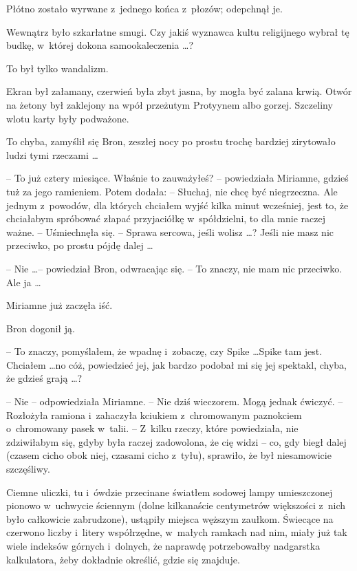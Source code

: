 \documentclass[oneside,polish,11pt,rmheadings]{mwbk}
\begin{document}
Płótno zostało wyrwane z~jednego końca z~płozów; odepchnął je. 

Wewnątrz było szkarłatne smugi. Czy jakiś wyznawca kultu religijnego wybrał tę budkę, w~której dokona samookaleczenia \ldots ? 

To był tylko wandalizm. 

Ekran był załamany, czerwień była zbyt jasna, by mogła być zalana krwią. Otwór na żetony był zaklejony na wpół przeżutym Protyynem albo gorzej. Szczeliny wlotu karty były podważone. 

To chyba, zamyślił się Bron, zeszłej nocy po prostu trochę bardziej zirytowało ludzi tymi rzeczami \ldots  

-- To już cztery miesiące. Właśnie to zauważyłeś? -- powiedziała Miriamne, gdzieś tuż za jego ramieniem.  Potem dodała: -- Słuchaj, nie chcę być niegrzeczna. Ale jednym z~powodów, dla których chciałem wyjść kilka minut wcześniej, jest to, że chciałabym spróbować złapać przyjaciółkę w~spółdzielni, to dla mnie raczej ważne. -- Uśmiechnęła się. -- Sprawa sercowa, jeśli wolisz \ldots ? Jeśli nie masz nic przeciwko, po prostu pójdę dalej \ldots  

-- Nie \ldots  -- powiedział Bron, odwracając się. -- To znaczy, nie mam nic przeciwko. Ale ja \ldots  

Miriamne już zaczęła iść. 

Bron dogonił ją. 

-- To znaczy, pomyślałem, że wpadnę i~zobaczę, czy Spike \ldots  Spike tam jest. Chciałem \ldots  no cóż, powiedzieć jej, jak bardzo podobał mi się jej spektakl, chyba, że gdzieś grają \ldots ?  

-- Nie -- odpowiedziała Miriamne.  -- Nie dziś wieczorem. Mogą jednak ćwiczyć. -- Rozłożyła ramiona i~zahaczyła kciukiem z~chromowanym paznokciem o~chromowany pasek w~talii. -- Z~kilku rzeczy, które powiedziała, nie zdziwiłabym się, gdyby była raczej zadowolona, że cię widzi -- co, gdy biegł dalej (czasem cicho obok niej, czasami cicho z~tyłu), sprawiło, że był niesamowicie szczęśliwy. 

Ciemne uliczki, tu i~ówdzie przecinane światłem sodowej lampy umieszczonej pionowo w~uchwycie ściennym (dolne kilkanaście centymetrów większości z~nich było całkowicie zabrudzone), ustąpiły miejsca węższym zaułkom. Świecące na czerwono liczby i~litery współrzędne, w~małych ramkach nad nim, miały już tak wiele indeksów górnych i~dolnych, że naprawdę potrzebowałby nadgarstka kalkulatora, żeby dokładnie określić, gdzie się znajduje. 
\end{document}
